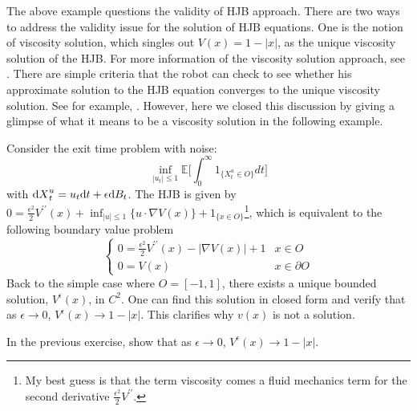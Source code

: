 \documentclass[11pt]{book}
\newcommand{\dd}{\text{\normalfont d}}
\newcommand{\dt}{\text{\normalfont d}t}
\newcommand{\dX}{\text{\normalfont d}X}
\begin{document}
The above example questions the validity of HJB approach. There are two ways to address the validity issue for the solution of HJB equations. One is the notion of viscosity solution, which singles out $V(x)=1-|x|$, as the unique viscosity solution of the HJB. For more information of the viscosity solution approach, see \cite{CIL92}. There are simple criteria that the robot can check to see whether his approximate solution to the HJB equation converges to the unique viscosity solution. See for example, \cite{Barles-Souganidis91}. However, here we closed this discussion by giving a glimpse of what it means to be a viscosity solution in the following example.
\begin{eg}
Consider the exit time problem with noise:
    \begin{equation}
        \inf_{|u_t|\le 1}\mathbb{E}\Big[\int_0^\infty 1_{\{X^u_t\in O\}} dt\Big]
    \end{equation}
with    ${\dX}_t^u=u_t{\dt}+\epsilon{\dd}B_t$.
The HJB is given by 
$0=\frac{\epsilon^2}{2}V^{\prime\prime}(x)+\inf_{|u|\le 1}\{u\cdot \nabla V(x)\}+1_{\{x\in O\}}$\footnote{My best guess is that the term viscosity comes a fluid mechanics term for the second derivative $\frac{\epsilon^2}{2}V^{\prime\prime}$.}, which is equivalent to the following boundary value problem
   \begin{equation}
   \begin{cases}
       0=\frac{\epsilon^2}{2}V^{\prime\prime}(x)-|\nabla V(x)|+1& x\in O\\
       0=V(x)& x\in\partial O
   \end{cases}
   \end{equation}
Back to the simple case where $O=[-1,1]$, there exists a unique bounded solution, $V^{\epsilon}(x)$, in $C^2$. One can find this solution in closed form and verify that as $\epsilon\to 0$, $V^{\epsilon}(x)\to 1-|x|$. This clarifies why $v(x)$ is not a solution.
\end{eg}
\begin{ex}
     In the previous exercise, show that as $\epsilon\to 0$, $V^{\epsilon}(x)\to 1-|x|$.  
\end{ex}

\end{document}
